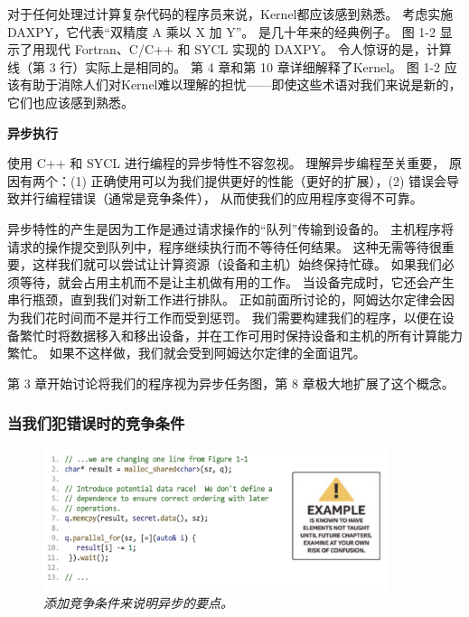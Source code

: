 对于任何处理过计算复杂代码的程序员来说，Kernel都应该感到熟悉。 
考虑实施 DAXPY，它代表“双精度 A 乘以 X 加 Y”。 是几十年来的经典例子。 
图 1-2 显示了用现代 Fortran、C/C++ 和 SYCL 实现的 DAXPY。 
令人惊讶的是，计算线（第 3 行）实际上是相同的。 第 4 章和第 10 章详细解释了Kernel。 
图 1-2 应该有助于消除人们对Kernel难以理解的担忧——即使这些术语对我们来说是新的，它们也应该感到熟悉。

\textbf{异步执行}

使用 C++ 和 SYCL 进行编程的异步特性不容忽视。 理解异步编程至关重要，
原因有两个：(1) 正确使用可以为我们提供更好的性能（更好的扩展），(2) 错误会导致并行编程错误（通常是竞争条件），
从而使我们的应用程序变得不可靠。

异步特性的产生是因为工作是通过请求操作的“队列”传输到设备的。 
主机程序将请求的操作提交到队列中，程序继续执行而不等待任何结果。 
这种无需等待很重要，这样我们就可以尝试让计算资源（设备和主机）始终保持忙碌。 
如果我们必须等待，就会占用主机而不是让主机做有用的工作。 当设备完成时，它还会产生串行瓶颈，直到我们对新工作进行排队。 
正如前面所讨论的，阿姆达尔定律会因为我们花时间而不是并行工作而受到惩罚。 
我们需要构建我们的程序，以便在设备繁忙时将数据移入和移出设备，并在工作可用时保持设备和主机的所有计算能力繁忙。 
如果不这样做，我们就会受到阿姆达尔定律的全面诅咒。

第 3 章开始讨论将我们的程序视为异步任务图，第 8 章极大地扩展了这个概念。

\subsubsection{当我们犯错误时的竞争条件}

\begin{figure}[H]
	\centering
	\includegraphics[width=0.9\textwidth]{figs/F1.3.png}
	\caption{\textit{添加竞争条件来说明异步的要点。}}
\end{figure}

